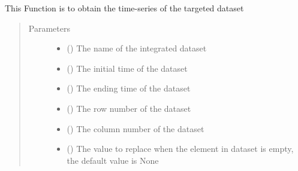 \documentclass[letterpaper,10pt,english]{sphinxmanual}
\begin{document}
\begin{fulllineitems}
\begin{fulllineitems}
\begin{quote}
\begin{description}
\end{description}\end{quote}

\end{fulllineitems}


\begin{fulllineitems}
\label{\detokenize{AgentTools.util:AgentTools.util.OutputUtil.OutputUtil.get_time_series}}
This Function is to obtain the time-series of the targeted dataset
\begin{quote}\begin{description}
\item[{Parameters}] \leavevmode\begin{itemize}
\item {} 
 () \textendash{} The name of the integrated dataset

\item {} 
 () \textendash{} The initial time of the dataset

\item {} 
 () \textendash{} The ending time of the dataset

\item {} 
 () \textendash{} The row number of the dataset

\item {} 
 () \textendash{} The column number of the dataset

\item {} 
 () \textendash{} The value to replace when the element in dataset is empty, the default value is None


\end{itemize}
\end{description}
\end{quote}
\end{fulllineitems}
\end{fulllineitems}
\end{document}
